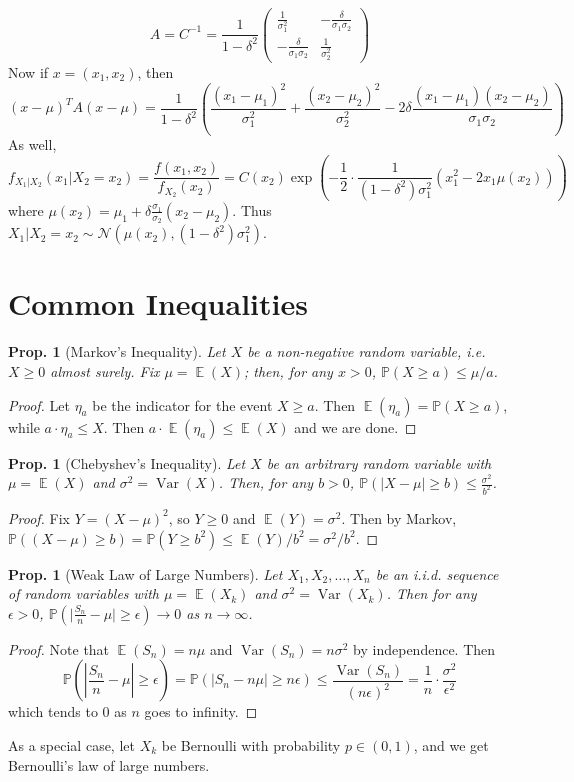 \documentclass[12pt, a4paper]{book}
\DeclareMathOperator{\E}{\mathbb{E}}
\DeclareMathOperator{\Var}{Var}
\renewcommand{\Pr}{\mathbb{P}}
\newtheorem{proposition}[theorem]{Prop.}
\theoremstyle{nonumberplain}
\newtheorem{proof}{Proof}
\begin{document}
\[A=C^{-1}=\frac{1}{1-\delta^2}\begin{pmatrix}\frac{1}{\sigma_1^2} &-\frac{\delta}{\sigma_1\sigma_2}\\-\frac{\delta}{\sigma_1\sigma_2} &\frac{1}{\sigma_2^2}\end{pmatrix}\]
Now if $x=(x_1,x_2)$, then
\[(x-\mu)^TA(x-\mu)=\frac{1}{1-\delta^2}\left(\frac{(x_1-\mu_1)^2}{\sigma_1^2}+\frac{(x_2-\mu_2)^2}{\sigma_2^2}-2\delta\frac{(x_1-\mu_1)(x_2-\mu_2)}{\sigma_1\sigma_2}\right)\]
As well,
\[f_{X_1|X_2}(x_1|X_2=x_2) = \frac{f(x_1,x_2)}{f_{X_2}(x_2)}=C(x_2)\exp\left(-\frac{1}{2}\cdot\frac{1}{(1-\delta^2)\sigma_1^2}(x_1^2-2x_1\mu(x_2))\right)\]
where $\mu(x_2)=\mu_1+\delta\frac{\sigma_1}{\sigma_2}(x_2-\mu_2)$.
Thus $X_1|X_2=x_2\sim\mathcal{N}(\mu(x_2),(1-\delta^2)\sigma_1^2)$.
\section{Common Inequalities}
\begin{proposition}[Markov's Inequality]
    Let $X$ be a non-negative random variable, i.e. $X\geq 0$ almost surely.
    Fix $\mu=\E(X)$; then, for any $x>0$, $\Pr(X\geq a)\leq\mu/a$.
\end{proposition}
\begin{proof}
    Let $\eta_a$ be the indicator for the event $X\geq a$.
    Then $\E(\eta_a)=\Pr(X\geq a)$, while $a\cdot\eta_a\leq X$.
    Then $a\cdot \E(\eta_a)\leq\E(X)$ and we are done.
\end{proof}
\begin{proposition}[Chebyshev's Inequality]
    Let $X$ be an arbitrary random variable with $\mu=\E(X)$ and $\sigma^2=\Var(X)$.
    Then, for any $b>0$, $\Pr(|X-\mu|\geq b)\leq\frac{\sigma^2}{b^2}$.
\end{proposition}
\begin{proof}
    Fix $Y=(X-\mu)^2$, so $Y\geq 0$ and $\E(Y)=\sigma^2$.
    Then by Markov, $\Pr((X-\mu)\geq b)=\Pr(Y\geq b^2)\leq\E(Y)/b^2=\sigma^2/b^2$.
\end{proof}
\begin{proposition}[Weak Law of Large Numbers]
    Let $X_1,X_2,\ldots,X_n$ be an i.i.d. sequence of random variables with $\mu=\E(X_k)$ and $\sigma^2=\Var(X_k)$.
    Then for any $\epsilon>0$, $\Pr\left(\lvert\frac{S_n}{n}-\mu\rvert\geq\epsilon\right)\to 0$ as $n\to\infty$.
\end{proposition}
\begin{proof}
    Note that $\E(S_n)=n\mu$ and $\Var(S_n)=n\sigma^2$ by independence.
    Then
    \begin{equation*}
        \Pr\left(\left\lvert\frac{S_n}{n}-\mu\right\rvert\geq\epsilon\right)=\Pr(|S_n-n\mu|\geq n\epsilon)\leq\frac{\Var(S_n)}{(n\epsilon)^2}=\frac{1}{n}\cdot\frac{\sigma^2}{\epsilon^2}
    \end{equation*}
    which tends to $0$ as $n$ goes to infinity.
\end{proof}
As a special case, let $X_k$ be Bernoulli with probability $p\in(0,1)$, and we get Bernoulli's law of large numbers.
\end{document}
